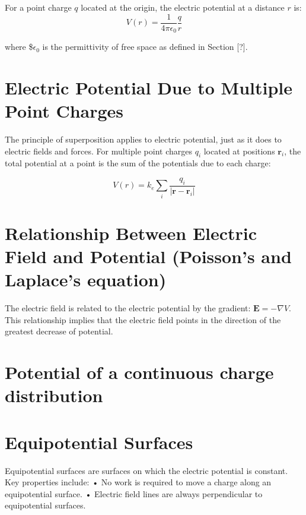 \documentclass[
  letterpaper,
  DIV=11,
  numbers=noendperiod]{scrreprt}
\begin{document}
For a point charge \(q\) located at the origin, the electric potential
at a distance \(r\) is:
\[ V(r) = \frac{1}{4\pi\epsilon_0} \frac{q}{r} \]

where \$\(\epsilon_0\) is the permittivity of free space as defined in
Section {[}?{]}.

\section{Electric Potential Due to Multiple Point
Charges}\label{electric-potential-due-to-multiple-point-charges}

The principle of superposition applies to electric potential, just as it
does to electric fields and forces. For multiple point charges \(q_i\)
located at positions \(\mathrm{\mathbf{r}}_i\), the total potential at a
point is the sum of the potentials due to each
charge:

\[ V(r) = k_e \sum_{i} \frac{q_i}{|\mathrm{\mathbf{r}}- \mathrm{\mathbf{r}}_i|} \]

\section{Relationship Between Electric Field and Potential (Poisson's
and Laplace's
equation)}\label{relationship-between-electric-field-and-potential-poissons-and-laplaces-equation}

The electric field is related to the electric potential by the gradient:
\(\mathrm{\mathbf{E}}= -\nabla V\). This relationship implies that the
electric field points in the direction of the greatest decrease of
potential.

\section{Potential of a continuous charge
distribution}\label{potential-of-a-continuous-charge-distribution}

\section{Equipotential Surfaces}\label{equipotential-surfaces}

Equipotential surfaces are surfaces on which the electric potential is
constant. Key properties include: • No work is required to move a charge
along an equipotential surface. • Electric field lines are always
perpendicular to equipotential surfaces.
\end{document}
